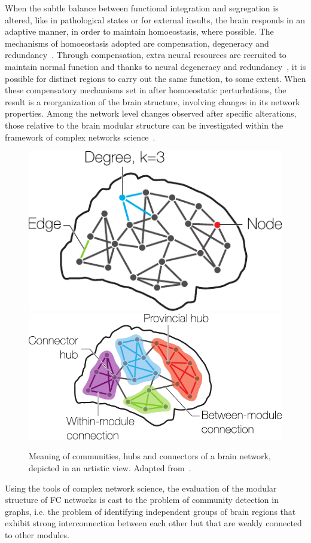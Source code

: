 \documentclass[11pt,              a4paper,              twoside,openright,              titlepage,              headinclude,footinclude,                            numbers=noenddot,              cleardoublepage=empty,]{scrreprt}
\begin{document}
When the subtle balance between functional integration and segregation is altered, like in pathological states or for external insults, the brain responds in an adaptive manner, in order to maintain homoeostasis, where possible. The mechanisms of homoeostasis adopted are compensation, degeneracy and redundancy~\cite{fornito2015}.
Through compensation, extra neural resources are recruited to maintain normal function and thanks to neural degeneracy and redundancy~\cite{tononi1999}, it is possible for distinct regions to carry out the same function, to some extent.
When these compensatory mechanisms set in after homoeostatic perturbations, the result is a reorganization of the brain structure, involving changes in its network properties.
Among the network level changes observed after specific alterations, those relative to the brain modular structure can be investigated within the framework of complex networks science~\cite{alexander-bloch2010,alexander-bloch2012,meunier2009}.

\begin{figure}[htb!]
\centering
\hfill\includegraphics[height=0.25\textwidth]{images/brain_network_basics.pdf}\hfill
\includegraphics[height=0.25\textwidth]{images/brain_network_communities.pdf}\hfill
\caption{Meaning of communities, hubs and connectors of a brain network, depicted in an artistic view. Adapted from~\cite{sporns2016}.}
\label{fig:brain_network_communities}
\end{figure}


Using the tools of complex network science, the evaluation of the modular structure of FC networks is cast to the problem of community detection in graphs, i.e. the problem of identifying independent groups of brain regions that exhibit strong interconnection between each other but that are weakly connected to other modules.
\end{document}
